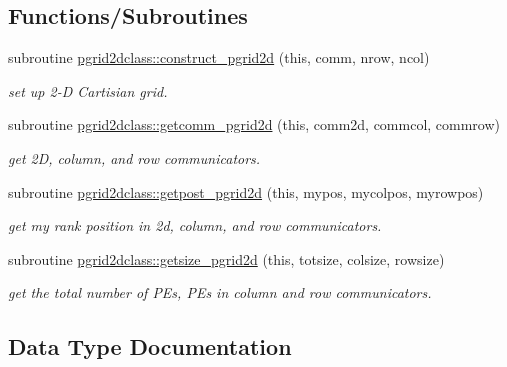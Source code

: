 \subsection*{Functions/\+Subroutines}
\begin{DoxyCompactItemize}
\item 
subroutine \mbox{\hyperlink{namespacepgrid2dclass_a93b626c7a473ab28463a29b9661dcefb}{pgrid2dclass\+::construct\+\_\+pgrid2d}} (this, comm, nrow, ncol)
\begin{DoxyCompactList}\small\item\em set up 2-\/D Cartisian grid. \end{DoxyCompactList}\item 
subroutine \mbox{\hyperlink{namespacepgrid2dclass_a550cb1b5c94a9e168c3e0108bb8a6d5b}{pgrid2dclass\+::getcomm\+\_\+pgrid2d}} (this, comm2d, commcol, commrow)
\begin{DoxyCompactList}\small\item\em get 2D, column, and row communicators. \end{DoxyCompactList}\item 
subroutine \mbox{\hyperlink{namespacepgrid2dclass_a559d4550356f88440ae55fceda480de2}{pgrid2dclass\+::getpost\+\_\+pgrid2d}} (this, mypos, mycolpos, myrowpos)
\begin{DoxyCompactList}\small\item\em get my rank position in 2d, column, and row communicators. \end{DoxyCompactList}\item 
subroutine \mbox{\hyperlink{namespacepgrid2dclass_ac088657db5b1deb05bb1ec732579ba53}{pgrid2dclass\+::getsize\+\_\+pgrid2d}} (this, totsize, colsize, rowsize)
\begin{DoxyCompactList}\small\item\em get the total number of P\+Es, P\+Es in column and row communicators. \end{DoxyCompactList}\end{DoxyCompactItemize}


\subsection{Data Type Documentation}
\label{structpgrid2dclass_1_1pgrid2d}
